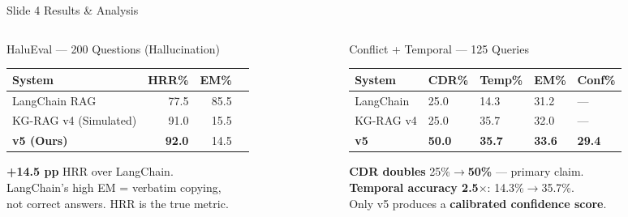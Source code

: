 \documentclass[aspectratio=169, 10pt]{beamer}
\newcommand{\rowV}{\rowcolor{iiitblue!15}}
\begin{document}
\begin{frame}{Slide 4 \quad Results \& Analysis}

\begin{columns}[T]
\begin{column}{0.47\textwidth}
  \begin{block}{\small HaluEval — 200 Questions (Hallucination)}
    \centering\scriptsize
    \begin{tabular}{lrrr}
      \toprule
      \textbf{System} & \textbf{HRR\%} & \textbf{EM\%} \\
      \midrule
      LangChain RAG          & 77.5 & 85.5 \\
      KG-RAG v4 (Simulated)  & 91.0 & 15.5 \\
      \rowV \textbf{v5 (Ours)}& \textbf{92.0} & 14.5 \\
      \bottomrule
    \end{tabular}
    \vspace{3pt}

    \raggedright
    \textbf{+14.5 pp} HRR over LangChain.\\
    LangChain's high EM = verbatim copying,\\
    not correct answers. HRR is the true metric.
  \end{block}
\end{column}
\begin{column}{0.50\textwidth}
  \begin{block}{\small Conflict + Temporal — 125 Queries}
    \centering\scriptsize
    \begin{tabular}{lC{1.1cm}C{1.1cm}C{1.1cm}C{1.1cm}}
      \toprule
      \textbf{System} & \textbf{CDR\%} & \textbf{Temp\%} & \textbf{EM\%} & \textbf{Conf\%}\\
      \midrule
      LangChain  & 25.0 & 14.3 & 31.2 & --- \\
      KG-RAG v4  & 25.0 & 35.7 & 32.0 & --- \\
      \rowV \textbf{v5} & \textbf{50.0} & \textbf{35.7} & \textbf{33.6} & \textbf{29.4} \\
      \bottomrule
    \end{tabular}
    \vspace{3pt}

    \raggedright
    \textbf{CDR doubles} 25\%$\to$\textbf{50\%} — primary claim.\\
    \textbf{Temporal accuracy 2.5$\times$}: 14.3\%$\to$35.7\%.\\
    Only v5 produces a \textbf{calibrated confidence score}.
  \end{block}
\end{column}
\end{columns}


\end{frame}
\end{document}
